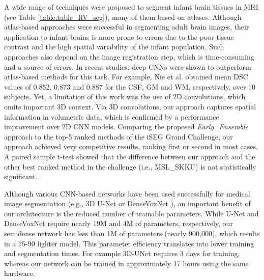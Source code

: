 \documentclass[twoside,espcrc2]{elsarticle}
\begin{document}
A wide range of techniques were proposed to segment infant brain tissues in MRI (see Table \ref{table:table_RV_seg}), many of them based on atlases. Although atlas-based approaches were successful in segmenting adult brain images, their application to infant brains is more prone to errors due to the poor tissue contrast and the high spatial variability of the infant population. Such approaches also depend on the image registration step, which is time-consuming and a source of errors. In recent studies, deep CNNs were shown to outperform atlas-based methods for this task. For example, Nie et al. \cite{nie2016fully} obtained mean DSC values of 0.852, 0.873 and 0.887 for the CSF, GM and WM, respectively, over 10 subjects. Yet, a limitation of this work was the use of 2D convolutions, which omits important 3D context. Via 3D convolutions, our approach captures spatial information in volumetric data, which is confirmed by a performance improvement over 2D CNN models. Comparing the proposed \textit{Early\_Ensemble} approach to the top-5 ranked methods of the iSEG Grand Challenge, our approach achieved very competitive results, ranking first or second in most cases. A paired sample t-test showed that the difference between our approach and the other best ranked method in the challenge (i.e.,  MSL\_SKKU) is not statistically significant.

Although various CNN-based networks have been used successfully for medical image segmentation (e.g., 3D U-Net \cite{cciccek20163d} or DenseVoxNet \cite{yu2017automatic}), an important benefit of our architecture is the reduced number of trainable parameters. While U-Net and DenseVoxNet require nearly 19M and 4M of parameters, respectively, our semidense network has less than 1M of parameters (nearly 900,000), which results in a 75-90 lighter model. This parameter efficiency translates into lower training and segmentation times. For example 3D-UNet requires 3 days for training, whereas our network can be trained in approximately 17 hours using the same hardware. 
\end{document}
